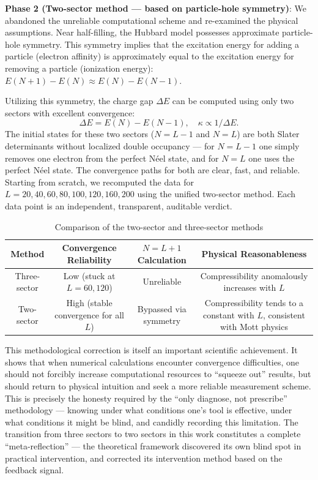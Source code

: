 \documentclass[prb,reprint,twocolumn,superscriptaddress]{revtex4-2}
\begin{document}
\textbf{Phase 2 (Two-sector method --- based on particle-hole symmetry)}: We abandoned the unreliable computational scheme and re-examined the physical assumptions. Near half-filling, the Hubbard model possesses approximate particle-hole symmetry. This symmetry implies that the excitation energy for adding a particle (electron affinity) is approximately equal to the excitation energy for removing a particle (ionization energy): $E(N+1) - E(N) \approx E(N) - E(N-1)$.

Utilizing this symmetry, the charge gap $\Delta E$ can be computed using only two sectors with excellent convergence:
\begin{equation}
\Delta E = E(N) - E(N-1), \quad \kappa \propto 1 / \Delta E.
\end{equation}
The initial states for these two sectors ($N = L-1$ and $N = L$) are both Slater determinants without localized double occupancy --- for $N = L-1$ one simply removes one electron from the perfect N\'{e}el state, and for $N = L$ one uses the perfect N\'{e}el state. The convergence paths for both are clear, fast, and reliable. Starting from scratch, we recomputed the data for $L = 20, 40, 60, 80, 100, 120, 160, 200$ using the unified two-sector method. Each data point is an independent, transparent, auditable verdict.

\begin{table}[htbp]
\caption{Comparison of the two-sector and three-sector methods}
\label{tab:sectors}
\begin{tabular}{cccc}
\toprule
Method & Convergence Reliability & $N=L+1$ Calculation & Physical Reasonableness \\
\midrule
Three-sector & Low (stuck at $L=60, 120$) & Unreliable & Compressibility anomalously increases with $L$ \\
Two-sector & High (stable convergence for all $L$) & Bypassed via symmetry & Compressibility tends to a constant with $L$, consistent with Mott physics \\
\bottomrule
\end{tabular}
\end{table}

This methodological correction is itself an important scientific achievement. It shows that when numerical calculations encounter convergence difficulties, one should not forcibly increase computational resources to ``squeeze out'' results, but should return to physical intuition and seek a more reliable measurement scheme. This is precisely the honesty required by the ``only diagnose, not prescribe'' methodology --- knowing under what conditions one's tool is effective, under what conditions it might be blind, and candidly recording this limitation. The transition from three sectors to two sectors in this work constitutes a complete ``meta-reflection'' --- the theoretical framework discovered its own blind spot in practical intervention, and corrected its intervention method based on the feedback signal.
\end{document}
